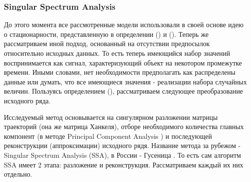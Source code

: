 \subsubsection{Singular Spectrum Analysis}
До этого момента все рассмотренные модели использовали в своей основе идею о стационарности, представленную в определении () и (). Теперь же рассматриваем иной подход, основанный на отсутствии предпосылок относительно исходных данных. То есть теперь имеющийся набор значений воспринимается как сигнал, характеризующий объект на некотором промежутке времени. Иными словами, нет необходимости предполагать как распределены данные или думать, что все имеющиеся значения - реализации набора случайных величин. Пользуясь определением (), рассматриваем следующее преобразование исходного ряда.

Исследуемый метод основывается на сингулярном разложении матрицы траекторий (она же матрица Ханкеля), отборе необходимого количества главных компонент (в методе Principal Component Analysis \cite{abdi2010pca}) и последующей реконструкции (аппроксимации) исходного рядя. Название метода за рубежом - Singular Spectrum Analysis (SSA), в России - Гусеница \cite{catarpillar_ssa}. То есть сам алгоритм SSA имеет 2 этапа: разложение и реконструкция. Рассматриваем каждый их них отдельно.

